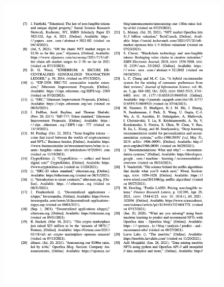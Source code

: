 \begin{figure}[h!]
\centering
\includegraphics[width=\textwidth]{images/appendix/papers/analysis/An Analysis of the Features Considerable for NFT Recommendations 6.jpeg}
\end{figure}


